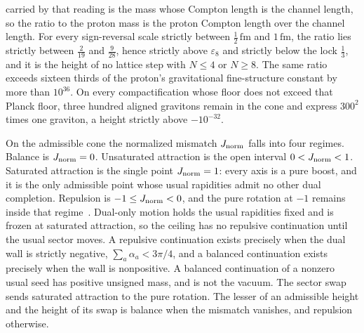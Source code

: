 \documentclass[a4paper]{article}
\begin{document}
carried by that reading is the mass whose Compton length is the channel length, so the ratio to the proton mass is the proton Compton length over the channel length. For every sign-reversal scale strictly between \(\tfrac12\,\mathrm{fm}\) and \(1\,\mathrm{fm}\), the ratio lies strictly between \(\tfrac{2}{19}\) and \(\tfrac{9}{28}\), hence strictly above \(\varepsilon_8\) and strictly below the lock \(\tfrac13\), and it is the height of no lattice step with \(N\le 4\) or \(N\ge 8\). The same ratio exceeds sixteen thirds of the proton's gravitational fine-structure constant by more than \(10^{36}\). On every compactification whose floor does not exceed that Planck floor, three hundred aligned gravitons remain in the cone and express \(300^{2}\) times one graviton, a height strictly above \(-10^{-32}\).

On the admissible cone the normalized mismatch \(J_{\rm norm}\) falls into four regimes. Balance is \(J_{\rm norm}=0\). Unsaturated attraction is the open interval \(0<J_{\rm norm}<1\). Saturated attraction is the single point \(J_{\rm norm}=1\): every axis is a pure boost, and it is the only admissible point whose usual rapidities admit no other dual completion. Repulsion is \(-1\le J_{\rm norm}<0\), and the pure rotation at \(-1\) remains inside that regime~\cite{dst-d4l}. Dual-only motion holds the usual rapidities fixed and is frozen at saturated attraction, so the ceiling has no repulsive continuation until the usual sector moves. A repulsive continuation exists precisely when the dual wall is strictly negative, \(\sum_a\alpha_a<3\pi/4\), and a balanced continuation exists precisely when the wall is nonpositive. A balanced continuation of a nonzero usual seed has positive unsigned mass, and is not the vacuum. The sector swap sends saturated attraction to the pure rotation. The lesser of an admissible height and the height of its swap is balance when the mismatch vanishes, and repulsion otherwise.
\end{document}
